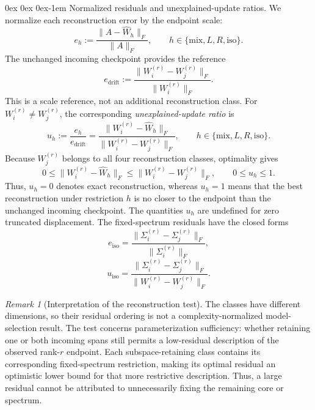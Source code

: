 \documentclass[11pt, a4paper]{utda}
\makeatletter
\renewcommand{\paragraph}{%
  \@startsection{paragraph}{4}%
  {\z@}{0ex \@plus 0ex \@minus 0ex}{-1em}%
  {\normalfont\normalsize\bfseries}%
}
\theoremstyle{plain}
\theoremstyle{definition}
\theoremstyle{remark}
\newtheorem{remark}[theorem]{Remark}
\makeatother
\begin{document}
\paragraph{Normalized residuals and unexplained-update ratios.}
We normalize each reconstruction error by the endpoint scale:
\begin{equation}
\label{eq:app_frame_residuals}
    e_h
    := \frac{\|A-\widehat W_h\|_F}{\|A\|_F},
    \qquad h\in\{\mathrm{mix},L,R,\mathrm{iso}\}.
\end{equation}
The unchanged incoming checkpoint provides the reference
\begin{equation}
\label{eq:app_frame_adaptability_drift}
    e_{\mathrm{drift}}
    := \frac{\|W_i^{(r)}-W_j^{(r)}\|_F}{\|W_i^{(r)}\|_F}.
\end{equation}
This is a scale reference, not an additional reconstruction class.
For $W_i^{(r)}\neq W_j^{(r)}$, the corresponding
\emph{unexplained-update ratio} is
\begin{equation}
\label{eq:app_unexplained_update_ratio}
    u_h
    := \frac{e_h}{e_{\mathrm{drift}}}
    = \frac{\|W_i^{(r)}-\widehat W_h\|_F}
           {\|W_i^{(r)}-W_j^{(r)}\|_F},
    \qquad h\in\{\mathrm{mix},L,R,\mathrm{iso}\}.
\end{equation}
Because $W_j^{(r)}$ belongs to all four reconstruction classes,
optimality gives
\[
    0\leq \|W_i^{(r)}-\widehat W_h\|_F
    \leq \|W_i^{(r)}-W_j^{(r)}\|_F,
    \qquad 0\leq u_h\leq1.
\]
Thus, $u_h=0$ denotes exact reconstruction, whereas $u_h=1$
means that the best reconstruction under restriction $h$ is no
closer to the endpoint than the unchanged incoming checkpoint.
The quantities $u_h$ are undefined for zero truncated displacement.
The fixed-spectrum residuals have the closed forms
\begin{equation}
\label{eq:app_fixed_spectrum_residual}
    e_{\mathrm{iso}}
    = \frac{\|\Sigma_i^{(r)}-\Sigma_j^{(r)}\|_F}
           {\|\Sigma_i^{(r)}\|_F},
\end{equation}
\begin{equation}
\label{eq:app-iso_transport_residual}
    u_{\mathrm{iso}}
    = \frac{\|\Sigma_i^{(r)}-\Sigma_j^{(r)}\|_F}
           {\|W_i^{(r)}-W_j^{(r)}\|_F}.
\end{equation}

\begin{remark}[Interpretation of the reconstruction test]
The classes have different dimensions, so their residual ordering
is not a complexity-normalized model-selection result.
The test concerns parameterization sufficiency: whether retaining
one or both incoming spans still permits a low-residual description
of the observed rank-$r$ endpoint.
Each subspace-retaining class contains its corresponding
fixed-spectrum restriction, making its optimal residual an
optimistic lower bound for that more restrictive description.
Thus, a large residual cannot be attributed to unnecessarily
fixing the remaining core or spectrum.
\end{remark}
\end{document}
